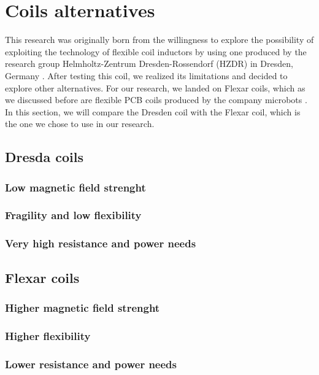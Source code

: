 \section{Coils alternatives}
This research was originally born from the willingness to explore the possibility of exploiting the technology of flexible coil inductors by using one produced by the research group Helmholtz-Zentrum Dresden-Rossendorf (HZDR) in Dresden, Germany \cite{HZDR}.
After testing this coil, we realized its limitations and decided to explore other alternatives.
For our research, we landed on Flexar coils, which as we discussed before are flexible PCB coils produced by the company microbots \cite{microbots}.
In this section, we will compare the Dresden coil with the Flexar coil, which is the one we chose to use in our research.

\subsection{Dresda coils}

\subsubsection{Low magnetic field strenght}

\subsubsection{Fragility and low flexibility}

\subsubsection{Very high resistance and power needs}


\subsection{Flexar coils}

\subsubsection{Higher magnetic field strenght}

\subsubsection{Higher flexibility}

\subsubsection{Lower resistance and power needs}

